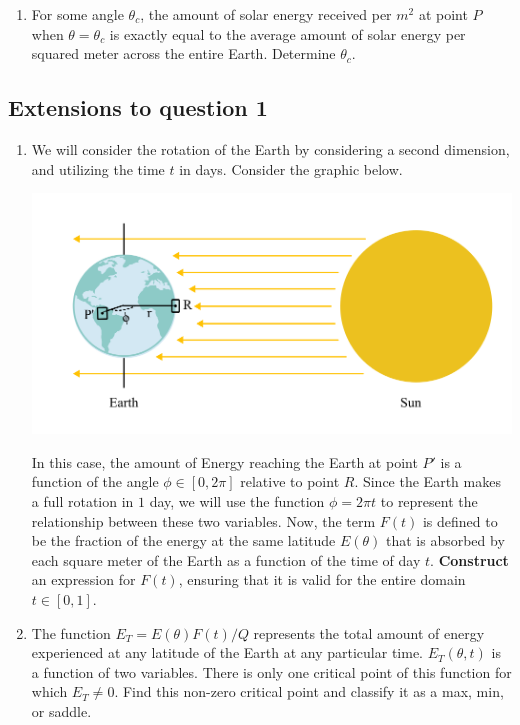 \documentclass{exam}
\begin{document}
\begin{enumerate}
\begin{enumerate}
        \item For some angle $\theta_c$, the amount of solar energy received per $m^2$ at point $P$ when $\theta=\theta_c$ is exactly equal to the average amount of solar energy per squared meter across the entire Earth. Determine $\theta_c$.

    
    \end{enumerate}

\subsection*{Extensions to question 1}
    
    
    \begin{enumerate}
        \item We will consider the rotation of the Earth by considering a second dimension, and utilizing the time $t$ in days. Consider the graphic below.
        
        \begin{centering}
        \includegraphics[scale=1]{sunrayqd.png}
        \end{centering}
        
        In this case, the amount of Energy reaching the Earth at point $P'$ is a function of the angle $\phi \in [0, 2\pi]$ relative to point $R$. Since the Earth makes a full rotation in $1$ day, we will use the function $\phi = 2\pi t$ to represent the relationship between these two variables. Now, the term $F(t)$ is defined to be the fraction of the energy at the same latitude $E(\theta)$ that is absorbed by each square meter of the Earth as a function of the time of day $t$. \textbf{Construct} an expression for $F(t)$, ensuring that it is valid for the entire domain $t \in [0,1]$.



        \item The function $E_T= E(\theta)F(t)/Q$ represents the total amount of energy experienced at any latitude of the Earth at any particular time. $E_T(\theta, t)$ is a function of two variables. There is only one critical point of this function for which $E_T \neq 0$. Find this non-zero critical point and classify it as a max, min, or saddle.
        



\end{enumerate}
\end{enumerate}
\end{document}
